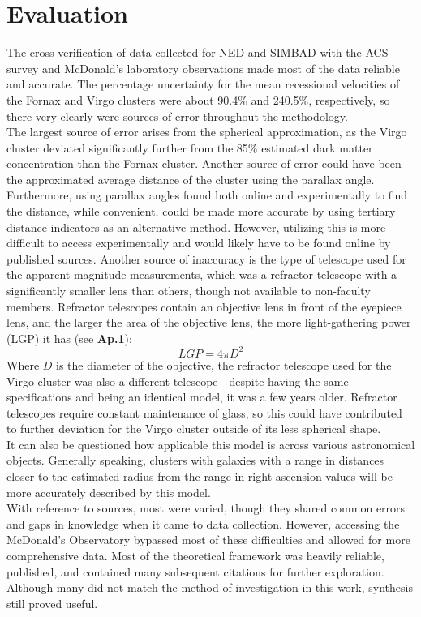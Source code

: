 \documentclass[12pt]{article}
\begin{document}
\section{Evaluation}
\noindent The cross-verification of data collected for NED and SIMBAD with the ACS survey and McDonald's laboratory observations made most of the data reliable and accurate. The percentage uncertainty for the mean recessional velocities of the Fornax and Virgo clusters were about 90.4\% and 240.5\%, respectively, so there very clearly were sources of error throughout the methodology.\\
\noindent The largest source of error arises from the spherical approximation, as the Virgo cluster deviated significantly further from the 85\% estimated dark matter concentration than the Fornax cluster. Another source of error could have been the approximated average distance of the cluster using the parallax angle. \\
\noindent Furthermore, using parallax angles found both online and experimentally to find the distance, while convenient, could be made more accurate by using tertiary distance indicators as an alternative method. However, utilizing this is more difficult to access experimentally and would likely have to be found online by published sources. Another source of inaccuracy is the type of telescope used for the apparent magnitude measurements, which was a refractor telescope with a significantly smaller lens than others, though not available to non-faculty members. Refractor telescopes contain an objective lens in front of the eyepiece lens, and the larger the area of the objective lens, the more light-gathering power (LGP) it has (see \textbf{Ap.1})\cite{Impey2023}:
\begin{equation}
    LGP = 4\pi D^2
\end{equation}
\noindent Where $D$ is the diameter of the objective, the refractor telescope used for the Virgo cluster was also a different telescope - despite having the same specifications and being an identical model, it was a few years older. Refractor telescopes require constant maintenance of glass, so this could have contributed to further deviation for the Virgo cluster outside of its less spherical shape.\\
\noindent It can also be questioned how applicable this model is across various astronomical objects. Generally speaking, clusters with galaxies with a range in distances closer to the estimated radius from the range in right ascension values will be more accurately described by this model.\\
\noindent With reference to sources, most were varied, though they shared common errors and gaps in knowledge when it came to data collection. However, accessing the McDonald's Observatory bypassed most of these difficulties and allowed for more comprehensive data. Most of the theoretical framework was heavily reliable, published, and contained many subsequent citations for further exploration. Although many did not match the method of investigation in this work, synthesis still proved useful.
\FloatBarrier
\end{document}
